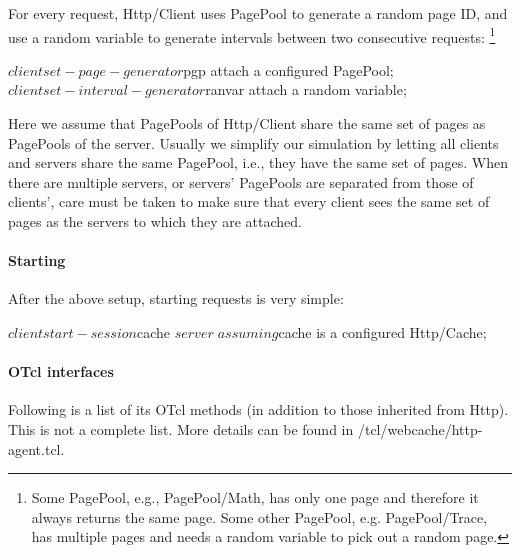 For every request, Http/Client uses PagePool to generate a random page
ID, and use a random variable to generate intervals between two 
consecutive requests:
\footnote{Some PagePool,
e.g., PagePool/Math, has only one page and therefore it always returns the
same page. Some other PagePool, e.g. PagePool/Trace, has multiple pages 
and needs a random variable to pick out a random page.} 

\begin{program}
        $client set-page-generator $pgp \; attach a configured PagePool;
        $client set-interval-generator $ranvar \; attach a random variable;
\end{program}

Here we assume that PagePools of Http/Client share the same set of pages
as PagePools of the server. Usually we simplify our simulation by letting
all clients and servers share the same PagePool, i.e., they have the same
set of pages. When there are multiple servers, or servers' PagePools 
are separated from those of clients', care must be taken to make sure that 
every client sees the same set of pages as the servers to which they are
attached.

\paragraph{Starting}

After the above setup, starting requests is very simple:

\begin{program}
        $client start-session $cache $server \; assuming $cache is a configured Http/Cache;
\end{program}

\paragraph{OTcl interfaces}
Following is a list of its OTcl methods (in addition to those
inherited from Http). This is not a complete list. More details can be
found in \ns/tcl/webcache/http-agent.tcl.

